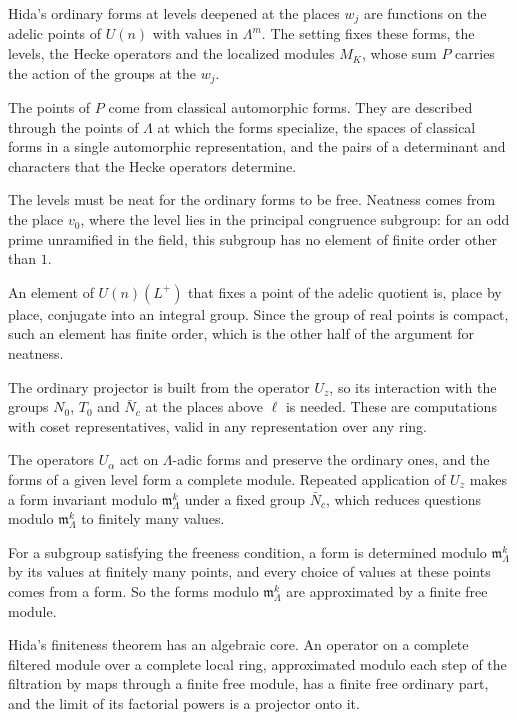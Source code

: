 Hida's ordinary forms at levels deepened at the places $w_j$ are functions on the adelic points of $U(n)$ with values in $\Lambda^m$. The setting fixes these forms, the levels, the Hecke operators and the localized modules $M_K$, whose sum $P$ carries the action of the groups at the $w_j$.

The points of $P$ come from classical automorphic forms. They are described through the points of $\Lambda$ at which the forms specialize, the spaces of classical forms in a single automorphic representation, and the pairs of a determinant and characters that the Hecke operators determine.

The levels must be neat for the ordinary forms to be free. Neatness comes from the place $v_0$, where the level lies in the principal congruence subgroup: for an odd prime unramified in the field, this subgroup has no element of finite order other than $1$.

An element of $U(n)(L^+)$ that fixes a point of the adelic quotient is, place by place, conjugate into an integral group. Since the group of real points is compact, such an element has finite order, which is the other half of the argument for neatness.

The ordinary projector is built from the operator $U_z$, so its interaction with the groups $N_0$, $T_0$ and $\bar N_c$ at the places above $\ell$ is needed. These are computations with coset representatives, valid in any representation over any ring.

The operators $U_\alpha$ act on $\Lambda$-adic forms and preserve the ordinary ones, and the forms of a given level form a complete module. Repeated application of $U_z$ makes a form invariant modulo $\mathfrak m_\Lambda^k$ under a fixed group $\bar N_c$, which reduces questions modulo $\mathfrak m_\Lambda^k$ to finitely many values.

For a subgroup satisfying the freeness condition, a form is determined modulo $\mathfrak m_\Lambda^k$ by its values at finitely many points, and every choice of values at these points comes from a form. So the forms modulo $\mathfrak m_\Lambda^k$ are approximated by a finite free module.

Hida's finiteness theorem has an algebraic core. An operator on a complete filtered module over a complete local ring, approximated modulo each step of the filtration by maps through a finite free module, has a finite free ordinary part, and the limit of its factorial powers is a projector onto it.

